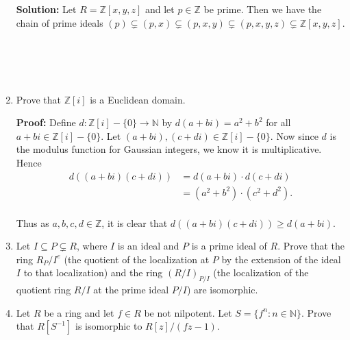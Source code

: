 \documentclass{article}
\newcommand\TheSolution{%
  \textbf{Solution:} %
}
\newcommand\Proof{%
	\textbf{Proof:} %
}
\begin{document}
\begin{enumerate}
	\TheSolution Let $R=\mathbb{Z}[x,y,z]$ and let $p \in \mathbb{Z}$ be prime. Then we have the chain of prime ideals $(p) \subsetneq (p,x) \subsetneq (p,x,y) \subsetneq (p,x,y,z) \subsetneq \mathbb{Z}[x,y,z]$.\\
\\
\\
\\
\\
	
	\item Prove that $\mathbb{Z}[i]$ is a Euclidean domain.
	
	\Proof Define $d: \mathbb{Z}[i]-\{0\} \to \mathbb{N}$ by $d(a+bi)=a^2+b^2$ for all $a+bi \in \mathbb{Z}[i]-\{0\}$. Let $(a+bi),(c+di) \in \mathbb{Z}[i]-\{0\}$. Now since $d$ is the modulus function for Gaussian integers, we know it is multiplicative. Hence
	\[
		\begin{split}
			d((a+bi)(c+di))&=d(a+bi) \cdot d(c+di) \\
							&= (a^2+b^2) \cdot (c^2+d^2).\\
		\end{split}
	\]
	
	Thus as $a,b,c,d \in \mathbb{Z}$, it is clear that $d((a+bi)(c+di)) \geq d(a+bi).$
	
	
	
	\item Let $I \subseteq P \subsetneq R$, where $I$ is an ideal and $P$ is a prime ideal of $R$. Prove that the ring $R_P/I^e$ (the quotient of the localization at $P$ by the extension of the ideal $I$ to that localization) and the ring $(R/I)_{P/I}$ (the localization of the quotient ring $R/I$ at the prime ideal $P/I$) are isomorphic.
	
	\item Let $R$ be a ring and let $f \in R$ be not nilpotent. Let $S=\{f^n:n \in \mathbb{N}\}$. Prove that $R[S^{-1}]$ is isomorphic to $R[z]/(fz-1)$. 
\end{enumerate}
\end{document}
